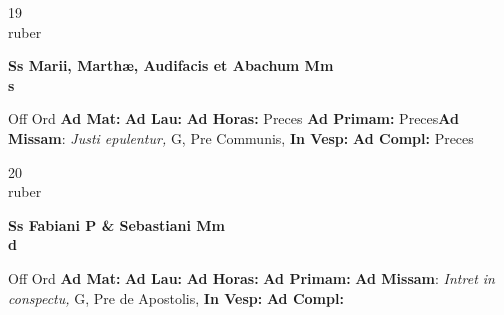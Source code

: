 \documentclass[10pt, openany]{book}
\begin{document}
    \begin{center}
        \begin{minipage}{3.5in}
            \vspace{2em}
            \begin{minipage}{0.5in}
                {\Huge 19} \\
                {\normalsize ruber}
            \end{minipage}
            \begin{minipage}{3.0in}
                \textbf{ \large Ss Marii, Marthæ, Audifacis et Abachum Mm \\
                \textnormal{\normalsize s}}

            \end{minipage}
            \begin{justify}Off Ord
                \textbf{Ad Mat: }
                \textbf{Ad Lau: }
                \textbf{Ad Horas: }Preces
                \textbf{Ad Primam: }Preces\textbf{Ad Missam}: \textit{Justi epulentur,} G, Pre Communis, 
                \textbf{In Vesp: }
                \textbf{Ad Compl: }Preces
            \end{justify}
        \end{minipage}
    \end{center}

    \begin{center}
        \begin{minipage}{3.5in}
            \vspace{2em}
            \begin{minipage}{0.5in}
                {\Huge 20} \\
                {\normalsize ruber}
            \end{minipage}
            \begin{minipage}{3.0in}
                \textbf{ \large Ss Fabiani P \& Sebastiani Mm \\
                \textnormal{\normalsize d}}

            \end{minipage}
            \begin{justify}Off Ord
                \textbf{Ad Mat: }
                \textbf{Ad Lau: }
                \textbf{Ad Horas: }
                \textbf{Ad Primam: }\textbf{Ad Missam}: \textit{Intret in conspectu,} G, Pre de Apostolis, 
                \textbf{In Vesp: }
                \textbf{Ad Compl: }
            \end{justify}
        \end{minipage}
    \end{center}
\end{document}
